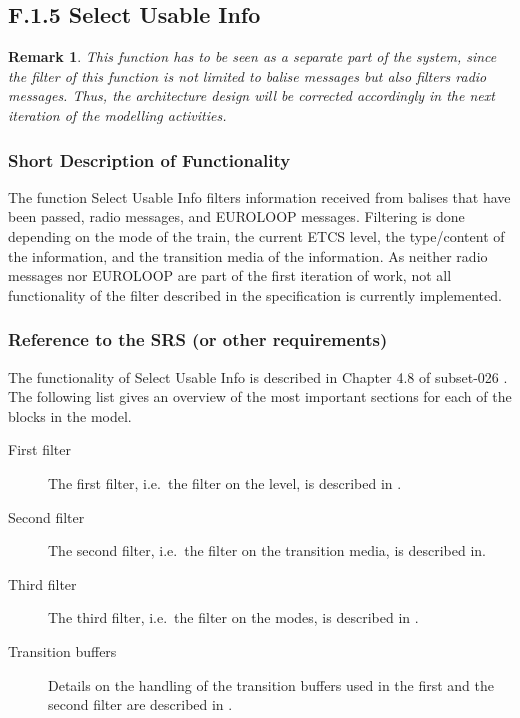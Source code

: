 \documentclass{template/openetcs_report}
\newtheorem{remark}{Remark}
\begin{document}
\subsection{F.1.5 Select Usable Info}
\begin{remark}
This function has to be seen as a separate part of the system, since the filter of this function is not limited to balise messages but also filters radio messages. Thus, the architecture design will be corrected accordingly in the next iteration of the modelling activities.
\end{remark}

\subsubsection{Short Description of Functionality}
The function Select Usable Info filters information received from balises that have been passed, radio messages, and EUROLOOP messages. Filtering is done depending on the mode of the train, the current ETCS level, the type/content of the information, and the transition media of the information. As neither radio messages nor EUROLOOP are part of the first iteration of work, not all functionality of the filter described in the specification is currently implemented.

\subsubsection{Reference to the SRS (or other requirements)}
The functionality of Select Usable Info is described in Chapter 4.8 of subset-026 \cite{subset-026}. The following list gives an overview of the most important sections for each of the blocks in the model.

\begin{description}
\item[First filter] The first filter, i.e.~the filter on the level, is described in \cite[Chapter~4.8.3]{subset-026}.
\item[Second filter] The second filter, i.e.~the filter on the transition media, is described in\cite[Chapter~4.8.3]{subset-026}.
\item[Third filter]
 The third filter, i.e.~the filter on the modes, is described in \cite[Chapter~4.8.4]{subset-026}.
\item[Transition buffers] Details on the handling of the transition buffers used in the first and the second filter are described in \cite[Chapter~4.8.5]{subset-026}.
\end{description}
\end{document}
